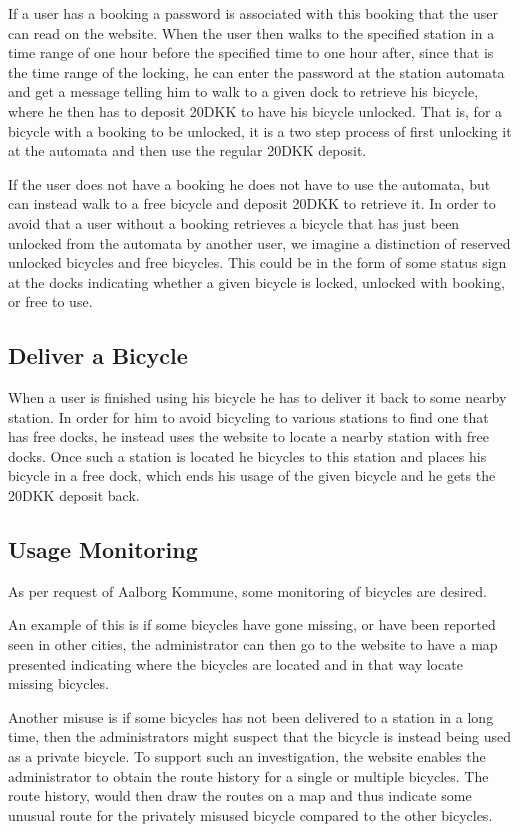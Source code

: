 If a user has a booking a password is associated with this booking that the user can read on the website.
When the user then walks to the specified station in a time range of one hour before the specified time to one hour after, since that is the time range of the locking, he can enter the password at the station automata and get a message telling him to walk to a given dock to retrieve his bicycle, where he then has to deposit 20DKK to have his bicycle unlocked.
That is, for a bicycle with a booking to be unlocked, it is a two step process of first unlocking it at the automata and then use the regular 20DKK deposit.

If the user does not have a booking he does not have to use the automata, but can instead walk to a free bicycle and deposit 20DKK to retrieve it.
In order to avoid that a user without a booking retrieves a bicycle that has just been unlocked from the automata by another user, we imagine a distinction of reserved unlocked bicycles and free bicycles.
This could be in the form of some status sign at the docks indicating whether a given bicycle is locked, unlocked with booking, or free to use.

\subsection{Deliver a Bicycle}
When a user is finished using his bicycle he has to deliver it back to some nearby station.
In order for him to avoid bicycling to various stations to find one that has free docks, he instead uses the website to locate a nearby station with free docks.
Once such a station is located he bicycles to this station and places his bicycle in a free dock, which ends his usage of the given bicycle and he gets the 20DKK deposit back.

\subsection{Usage Monitoring}
As per request of Aalborg Kommune, some monitoring of bicycles are desired.

An example of this is if some bicycles have gone missing, or have been reported seen in other cities, the administrator can then go to the website to have a map presented indicating where the bicycles are located and in that way locate missing bicycles.

Another misuse is if some bicycles has not been delivered to a station in a long time, then the administrators might suspect that the bicycle is instead being used as a private bicycle. To support such an investigation, the website enables the administrator to obtain the route history for a single or multiple bicycles.
The route history, would then draw the routes on a map and thus indicate some unusual route for the privately misused bicycle compared to the other bicycles.


